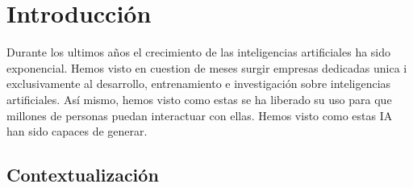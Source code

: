 \chapter{Introducción}
\label{cap:introducion}
\setcounter{page}{1}






Durante los ultimos años el crecimiento de las inteligencias artificiales ha sido exponencial. Hemos visto en cuestion de meses surgir empresas dedicadas unica i exclusivamente
al desarrollo, entrenamiento e investigación sobre inteligencias artificiales. Así mismo, hemos visto como estas se ha liberado su uso para que millones de personas puedan
interactuar con ellas. Hemos visto como estas IA han sido capaces de generar.

\section{Contextualización}
\label{sec:contextualizacion}
